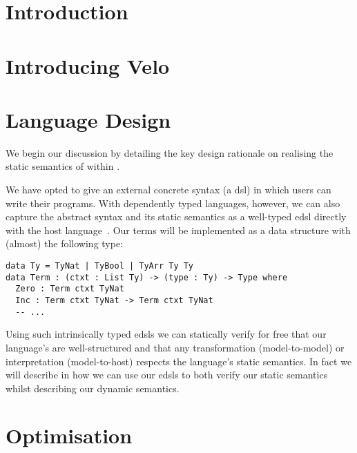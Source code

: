 \documentclass[%
draft, %
a4paper,
UKenglish,
cleveref,
autoref,
thm-restate,
pdfa
]{oasics-v2021}
\begin{document}

\section{Introduction}
\label{sec:introduction}




\section{Introducing Velo}
\label{sec:velo}



\section{Language Design}
\label{sec:design}

We begin our discussion by detailing the key design rationale on realising the static semantics of \Velo{} within \Idris{}.

We have opted to give \Velo{} an external concrete syntax (a \ac{dsl}) in which users can write their programs.
%
With dependently typed languages, however, we can also capture the abstract syntax and its static semantics as a well-typed \ac{edsl} directly with the host language~\cite{Augustsson1999edt}.
Our terms will be implemented as a data structure with (almost) the following type:

\begin{Verbatim}
data Ty = TyNat | TyBool | TyArr Ty Ty
data Term : (ctxt : List Ty) -> (type : Ty) -> Type where
  Zero : Term ctxt TyNat
  Inc : Term ctxt TyNat -> Term ctxt TyNat
  -- ...
\end{Verbatim}

\noindent
Using such intrinsically typed \acp{edsl} we can statically verify for free that our language's are well-structured and that any transformation (model-to-model) or interpretation (model-to-host) respects the language's static semantics.
In fact we will describe in  how we can use our \acp{edsl} to both verify our static semantics whilst describing our dynamic semantics.






\section{Optimisation}
\label{sec:compiler-pass}
\end{document}
